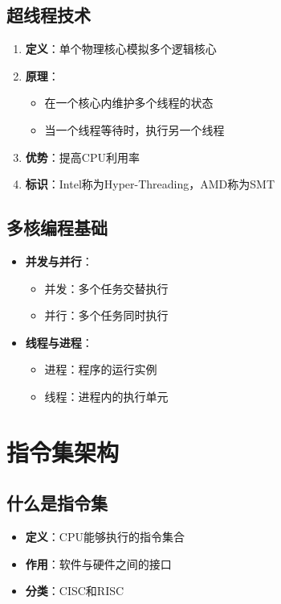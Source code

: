 \documentclass[12pt,UTF8]{ctexbook}
\begin{document}
\section{超线程技术}

\begin{enumerate}
    \item \textbf{定义}：单个物理核心模拟多个逻辑核心
    \item \textbf{原理}：
    \begin{itemize}[leftmargin=2em]
        \item 在一个核心内维护多个线程的状态
        \item 当一个线程等待时，执行另一个线程
    \end{itemize}
    \item \textbf{优势}：提高CPU利用率
    \item \textbf{标识}：Intel称为Hyper-Threading，AMD称为SMT
\end{enumerate}

\section{多核编程基础}

\begin{itemize}[leftmargin=2em]
    \item \textbf{并发与并行}：
    \begin{itemize}
        \item 并发：多个任务交替执行
        \item 并行：多个任务同时执行
    \end{itemize}
    \item \textbf{线程与进程}：
    \begin{itemize}
        \item 进程：程序的运行实例
        \item 线程：进程内的执行单元
    \end{itemize}
\end{itemize}

\chapter{指令集架构}

\section{什么是指令集}

\begin{itemize}[leftmargin=2em]
    \item \textbf{定义}：CPU能够执行的指令集合
    \item \textbf{作用}：软件与硬件之间的接口
    \item \textbf{分类}：CISC和RISC
\end{itemize}
\end{document}
